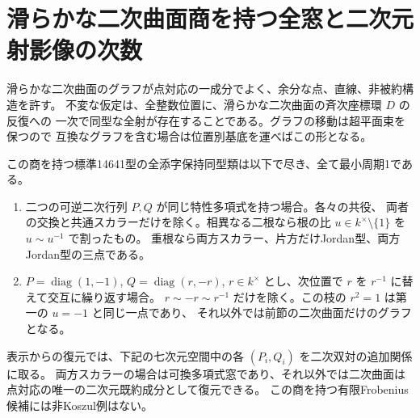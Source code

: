 \section{滑らかな二次曲面商を持つ全窓と二次元射影像の次数}
\label{sec:smooth-quadric-quotients}
滑らかな二次曲面のグラフが点対応の一成分でよく、余分な点、直線、非被約構造を許す。
不変な仮定は、全整数位置に、滑らかな二次曲面の斉次座標環 $D$ の反復への
一次で同型な全射が存在することである。グラフの移動は超平面束を保つので
互換なグラフを含む場合は位置別基底を運べばこの形となる。
\begin{theorem}\label{thm:smooth-quadric-quotients}
この商を持つ標準14641型の全添字保持同型類は以下で尽き、全て最小周期1である。
\begin{enumerate}
\item 二つの可逆二次行列 $P,Q$ が同じ特性多項式を持つ場合。各々の共役、
両者の交換と共通スカラーだけを除く。相異なる二根なら根の比
$u\in k^\times\setminus\{1\}$ を $u\sim u^{-1}$ で割ったもの。
重根なら両方スカラー、片方だけJordan型、両方Jordan型の三点である。
\item $P=\operatorname{diag}(1,-1)$, $Q=\operatorname{diag}(r,-r)$,
$r\in k^\times$ とし、次位置で $r$ を $r^{-1}$ に替えて交互に繰り返す場合。
$r\sim-r\sim r^{-1}$ だけを除く。この枝の $r^2=1$ は第一の $u=-1$ と同じ一点であり、
それ以外では前節の二次曲面だけのグラフとなる。
\end{enumerate}
表示からの復元では、下記の七次元空間中の各 $(P_i,Q_i)$ を二次双対の追加関係に取る。
両方スカラーの場合は可換多項式窓であり、それ以外では二次曲面は点対応の唯一の二次元既約成分として復元できる。
この商を持つ有限Frobenius候補には非Koszul例はない。
\end{theorem}
